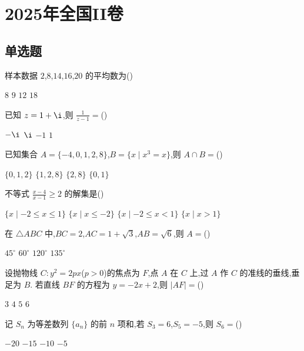 \chapter{2025年全国II卷}

\section{单选题}

\begin{problem}
样本数据 \(2\),\(8\),\(14\),\(16\),\(20\) 的平均数为(\quad)

\choices
    {\(8\)}
    {\(9\)}
    {\(12\)}
    {\(18\)}
\end{problem}

\begin{problem}
已知 \(z=1+\i\),则 \(\frac{1}{z-1}=\)(\quad)

\choices
    {\(-\i\)}
    {\(\i\)}
    {\(-1\)}
    {\(1\)}
\end{problem}

\begin{problem}
已知集合 \(A=\{-4,0,1,2,8\}\),\(B=\{x \mid x^3=x\}\),则 \(A\cap B=\)(\quad)

\choices
    {\(\{0,1,2\}\)}
    {\(\{1,2,8\}\)}
    {\(\{2,8\}\)}
    {\(\{0,1\}\)}
\end{problem}

\begin{problem}
不等式 \(\frac{x-4}{x-1}\ge 2\) 的解集是(\quad)

\choices
    {\(\{x \mid -2\le x\le 1\}\)}
    {\(\{x \mid x\le -2\}\)}
    {\(\{x \mid -2\le x<1\}\)}
    {\(\{x \mid x>1\}\)}
\end{problem}

\begin{problem}
在 \(\triangle ABC\) 中,\(BC=2\),\(AC=1+\sqrt3\),\(AB=\sqrt6\),则 \(A=\)(\quad)

\choices
    {\(45^\circ\)}
    {\(60^\circ\)}
    {\(120^\circ\)}
    {\(135^\circ\)}
\end{problem}

\begin{problem}
设抛物线 \(C:y^2=2px\)(\(p>0\))的焦点为 \(F\),点 \(A\) 在 \(C\) 上,过 \(A\) 作 \(C\) 的准线的垂线,垂足为 \(B\). 若直线 \(BF\) 的方程为 \(y=-2x+2\),则 \(|AF|=\)(\quad)

\choices
    {\(3\)}
    {\(4\)}
    {\(5\)}
    {\(6\)}
\end{problem}

\begin{problem}
记 \(S_n\) 为等差数列 \(\{a_n\}\) 的前 \(n\) 项和,若 \(S_3=6\),\(S_5=-5\),则 \(S_6=\)(\quad)

\choices
    {\(-20\)}
    {\(-15\)}
    {\(-10\)}
    {\(-5\)}
\end{problem}

